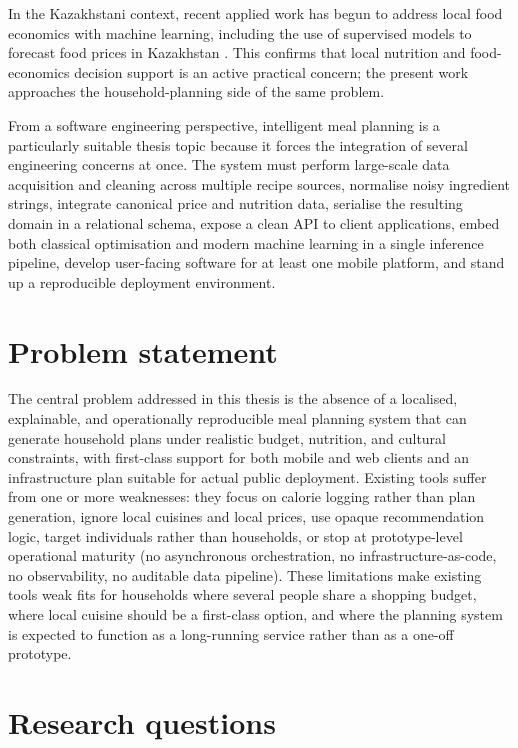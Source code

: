 In the Kazakhstani context, recent applied work has begun to address local food economics with machine learning, including the use of supervised models to forecast food prices in Kazakhstan \cite{sapakova2023application}. This confirms that local nutrition and food-economics decision support is an active practical concern; the present work approaches the household-planning side of the same problem.

From a software engineering perspective, intelligent meal planning is a particularly suitable thesis topic because it forces the integration of several engineering concerns at once. The system must perform large-scale data acquisition and cleaning across multiple recipe sources, normalise noisy ingredient strings, integrate canonical price and nutrition data, serialise the resulting domain in a relational schema, expose a clean API to client applications, embed both classical optimisation and modern machine learning in a single inference pipeline, develop user-facing software for at least one mobile platform, and stand up a reproducible deployment environment.

\section{Problem statement}

The central problem addressed in this thesis is the absence of a localised, explainable, and operationally reproducible meal planning system that can generate household plans under realistic budget, nutrition, and cultural constraints, with first-class support for both mobile and web clients and an infrastructure plan suitable for actual public deployment. Existing tools suffer from one or more weaknesses: they focus on calorie logging rather than plan generation, ignore local cuisines and local prices, use opaque recommendation logic, target individuals rather than households, or stop at prototype-level operational maturity (no asynchronous orchestration, no infrastructure-as-code, no observability, no auditable data pipeline). These limitations make existing tools weak fits for households where several people share a shopping budget, where local cuisine should be a first-class option, and where the planning system is expected to function as a long-running service rather than as a one-off prototype.

\section{Research questions}

